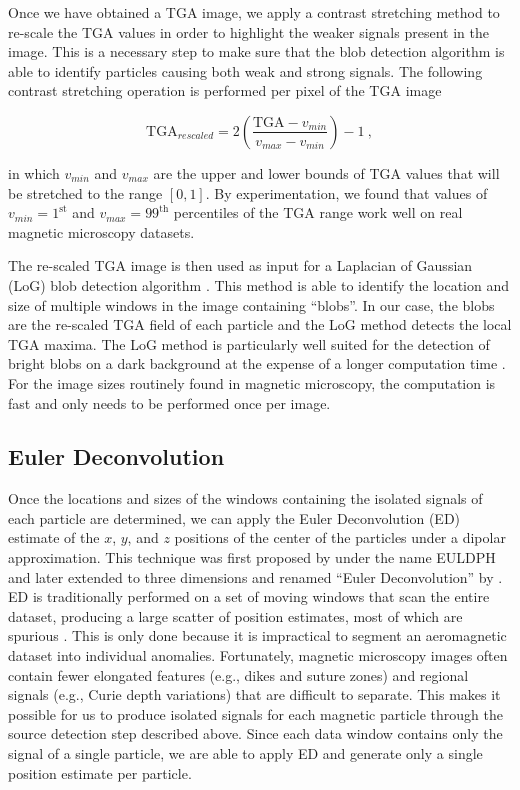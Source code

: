 Once we have obtained a TGA image, we apply a contrast stretching method to
re-scale the TGA values in order to highlight the weaker signals present in the
image. This is a necessary step to make sure that the blob detection algorithm
is able to identify particles causing both weak and strong signals. The
following contrast stretching operation is performed per pixel of the TGA image

\begin{equation}
\text{TGA}_{rescaled} =
2\left(\dfrac{\text{TGA} - v_{min}}{v_{max} - v_{min}}\right) - 1
\ ,
\end{equation}

\noindent
in which $v_{min}$ and $v_{max}$ are the upper and lower bounds of TGA values
that will be stretched to the range $[0, 1]$. By experimentation, we found
that values of $v_{min} = 1^\text{st}$ and $v_{max} = 99^\text{th}$
percentiles of the TGA range work well on real magnetic microscopy datasets.

The re-scaled TGA image is then used as input for a Laplacian of Gaussian (LoG)
blob detection algorithm \citep{Kong2013}. This method is able to identify the
location and size of multiple windows in the image containing ``blobs''. In our
case, the blobs are the re-scaled TGA field of each particle and the LoG method
detects the local TGA maxima. The LoG method is particularly well suited for
the detection of bright blobs on a dark background at the expense of a longer
computation time \citep{Han2016}. For the image sizes routinely found in
magnetic microscopy, the computation is fast and only needs to be performed
once per image.

\subsection{Euler Deconvolution}

Once the locations and sizes of the windows containing the isolated signals of
each particle are determined, we can apply the Euler Deconvolution (ED)
estimate of the $x$, $y$, and $z$ positions of the center of the particles
under a dipolar approximation. This technique was first proposed by
\citet{Thompson1982} under the name EULDPH and later extended to three
dimensions and renamed ``Euler Deconvolution'' by \citet{Reid1990}. ED is
traditionally performed on a set of moving windows that scan the entire
dataset, producing a large scatter of position estimates, most of which are
spurious \citep{Silva20033D}. This is only done because it is impractical to
segment an aeromagnetic dataset into individual anomalies. Fortunately,
magnetic microscopy images often contain fewer elongated features (e.g., dikes and
suture zones) and regional signals (e.g., Curie depth variations) that are
difficult to separate. This makes it possible for us to produce isolated
signals for each magnetic particle through the source detection step described
above. Since each data window contains only the signal of a single particle, we
are able to apply ED and generate only a single position estimate per particle.

